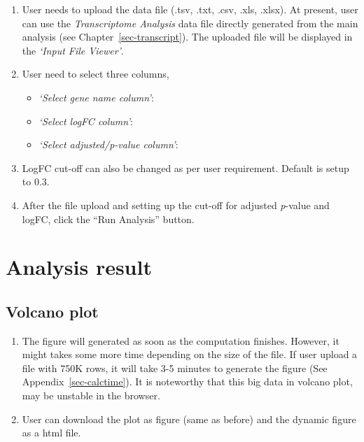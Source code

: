 \documentclass[
  a4paper,
  oneside,
  open=any]{scrreport}
\providecommand{\tightlist}{%
  \setlength{\itemsep}{0pt}\setlength{\parskip}{0pt}}\usepackage{longtable,booktabs,array}
\begin{document}
\begin{enumerate}
\def\labelenumi{\arabic{enumi}.}
\tightlist
\item
  User needs to upload the data file (.tsv, .txt, .csv, .xls, .xlsx). At
  present, user can use the \emph{Transcriptome Analysis} data file
  directly generated from the main analysis (see
  Chapter~\ref{sec-transcript}). The uploaded file will be displayed in
  the \emph{`Input File Viewer'}.
\item
  User need to select three columns,

  \begin{itemize}
  \tightlist
  \item
    \emph{`Select gene name column'}:
  \item
    \emph{`Select logFC column'}:
  \item
    \emph{`Select adjusted/p-value column'}:
  \end{itemize}
\item
  LogFC cut-off can also be changed as per user requirement. Default is
  setup to 0.3.
\item
  After the file upload and setting up the cut-off for adjusted
  \emph{p}-value and logFC, click the ``Run Analysis'' button.
\end{enumerate}

\hypertarget{analysis-result-2}{%
\section{Analysis result}\label{analysis-result-2}}

\hypertarget{volcano-plot}{%
\subsection{Volcano plot}\label{volcano-plot}}

\begin{enumerate}
\def\labelenumi{\arabic{enumi}.}
\tightlist
\item
  The figure will generated as soon as the computation finishes.
  However, it might takes some more time depending on the size of the
  file. If user upload a file with 750K rows, it will take 3-5 minutes
  to generate the figure (See Appendix~\ref{sec-calctime}). It is
  noteworthy that this big data in volcano plot, may be unstable in the
  browser.
\item
  User can download the plot as figure (same as before) and the dynamic
  figure as a html file.\\
\end{enumerate}
\end{document}
